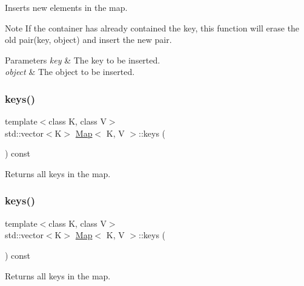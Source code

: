 Inserts new elements in the map.

\begin{DoxyNote}{Note}
If the container has already contained the key, this function will erase the old pair(key, object) and insert the new pair. 
\end{DoxyNote}

\begin{DoxyParams}{Parameters}
{\em key} & The key to be inserted. \\
\hline
{\em object} & The object to be inserted. \\
\hline
\end{DoxyParams}
\mbox{\label{classMap_a3126580ee7336d4170fde9f53c595406}} 
\subsubsection{\texorpdfstring{keys()}{keys()}\hspace{0.1cm}{\footnotesize\ttfamily [1/4]}}
{\footnotesize\ttfamily template$<$class K, class V$>$ \\
std\+::vector$<$K$>$ \hyperlink{classMap}{Map}$<$ K, V $>$\+::keys (\begin{DoxyParamCaption}{ }\end{DoxyParamCaption}) const\hspace{0.3cm}{\ttfamily [inline]}}

Returns all keys in the map. \mbox{\label{classMap_a3126580ee7336d4170fde9f53c595406}} 
\subsubsection{\texorpdfstring{keys()}{keys()}\hspace{0.1cm}{\footnotesize\ttfamily [2/4]}}
{\footnotesize\ttfamily template$<$class K, class V$>$ \\
std\+::vector$<$K$>$ \hyperlink{classMap}{Map}$<$ K, V $>$\+::keys (\begin{DoxyParamCaption}{ }\end{DoxyParamCaption}) const\hspace{0.3cm}{\ttfamily [inline]}}

Returns all keys in the map. \mbox{\label{classMap_ac01797a15562fef9b26ddc36256776e8}} 
